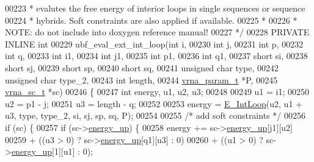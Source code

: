 \begin{DoxyCode}
00223 \textcolor{comment}{ *  evalutes the free energy of interior loops in single sequences or sequence}
00224 \textcolor{comment}{ *  hybrids. Soft constraints are also applied if available.}
00225 \textcolor{comment}{ *}
00226 \textcolor{comment}{ *  NOTE: do not include into doxygen reference manual!}
00227 \textcolor{comment}{ */}
00228 PRIVATE INLINE \textcolor{keywordtype}{int}
00229 ubf\_eval\_ext\_int\_loop(\textcolor{keywordtype}{int}           i,
00230                       \textcolor{keywordtype}{int}           j,
00231                       \textcolor{keywordtype}{int}           p,
00232                       \textcolor{keywordtype}{int}           q,
00233                       \textcolor{keywordtype}{int}           i1,
00234                       \textcolor{keywordtype}{int}           j1,
00235                       \textcolor{keywordtype}{int}           p1,
00236                       \textcolor{keywordtype}{int}           q1,
00237                       \textcolor{keywordtype}{short}         si,
00238                       \textcolor{keywordtype}{short}         sj,
00239                       \textcolor{keywordtype}{short}         sp,
00240                       \textcolor{keywordtype}{short}         sq,
00241                       \textcolor{keywordtype}{unsigned} \textcolor{keywordtype}{char} type,
00242                       \textcolor{keywordtype}{unsigned} \textcolor{keywordtype}{char} type\_2,
00243                       \textcolor{keywordtype}{int}           length,
00244                       \hyperlink{group__energy__parameters_structvrna__param__s}{vrna\_param\_t}  *P,
00245                       \hyperlink{group__soft__constraints_structvrna__sc__s}{vrna\_sc\_t}     *sc)
00246 \{
00247   \textcolor{keywordtype}{int} energy, u1, u2, u3;
00248 
00249   u1  = i1;
00250   u2  = p1 - j;
00251   u3  = length - q;
00252 
00253   energy = \hyperlink{group__loops_gaafbc187b7f78e8e82afb77dd6f3b8fc5}{E\_IntLoop}(u2, u1 + u3, type, type\_2, si, sj, sp, sq, P);
00254 
00255   \textcolor{comment}{/* add soft constraints */}
00256   \textcolor{keywordflow}{if} (sc) \{
00257     \textcolor{keywordflow}{if} (sc->\hyperlink{group__soft__constraints_a57e4dbb924ab11f304e3762a3a9b07a1}{energy\_up}) \{
00258       energy += sc->\hyperlink{group__soft__constraints_a57e4dbb924ab11f304e3762a3a9b07a1}{energy\_up}[j1][u2]
00259                 + ((u3 > 0) ? sc->\hyperlink{group__soft__constraints_a57e4dbb924ab11f304e3762a3a9b07a1}{energy\_up}[q1][u3] : 0)
00260                 + ((u1 > 0) ? sc->\hyperlink{group__soft__constraints_a57e4dbb924ab11f304e3762a3a9b07a1}{energy\_up}[1][u1] : 0);

\end{DoxyCode}
